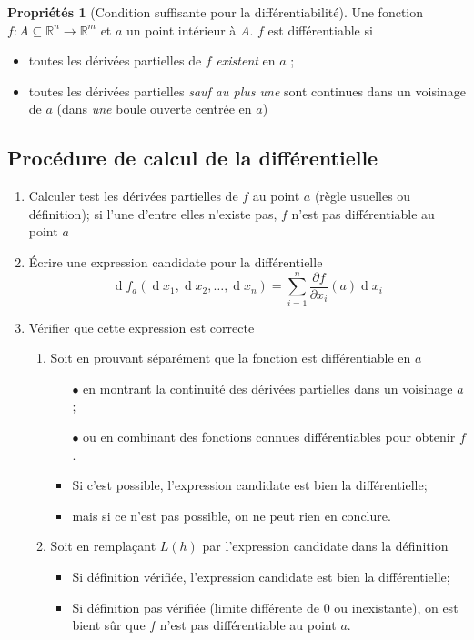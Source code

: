 \documentclass[11pt,a4paper]{article}
\theoremstyle{definition}
\newtheorem{myprop}[mydef]{Propriétés}
\DeclareMathOperator{\diff}{d}
\newcommand{\dif}{\diff\!}
\newcommand{\R}{\mathbb{R}}
\begin{document}
\begin{myprop}[Condition suffisante pour la différentiabilité] Une fonction $f : A \subseteq \R^n \to \R^m$ et $a$ un point intérieur à $A$. $f$ est différentiable si
	\begin{itemize}
		\item toutes les dérivées partielles de $f$ \emph{existent} en $a$ ;
		\item toutes les dérivées partielles \emph{sauf au plus une} sont continues dans un voisinage de $a$ (dans \emph{une} boule ouverte centrée en $a$)
	\end{itemize}
\end{myprop}

\subsection{Procédure de calcul de la différentielle}
\begin{enumerate}
	\item Calculer test les dérivées partielles de $f$ au point $a$ (règle usuelles ou définition);
		si l'une d'entre elles n'existe pas, $f$ n'est pas différentiable au point $a$
	\item Écrire une expression candidate pour la différentielle
		\[ \dif f_a(\dif x_1, \dif x_2, \dots, \dif x_n) = \sum_{i = 1}^n \frac{\partial f}{\partial x_i}(a) \dif x_i \]
	\item Vérifier que cette expression est correcte
		\begin{enumerate}
			\item Soit en prouvant séparément que la fonction est différentiable en $a$
				\begin{itemize}
					\item[$\bullet$] en montrant la continuité des dérivées partielles dans un voisinage $a$;
					\item[$\bullet$] ou en combinant des fonctions connues différentiables pour obtenir $f$.
				\end{itemize}
				\begin{itemize}
					\item Si c'est possible, l'expression candidate est bien la différentielle;
					\item mais si ce n'est pas possible, on ne peut rien en conclure.
				\end{itemize}
			\item Soit en remplaçant $L(h)$ par l'expression candidate dans la définition
				\begin{itemize}
					\item Si définition vérifiée, l'expression candidate est bien la différentielle;
					\item Si définition pas vérifiée (limite différente de 0 ou inexistante),
						on est bient sûr que $f$ n'est pas différentiable au point $a$.
				\end{itemize}
		\end{enumerate}
\end{enumerate}
\end{document}
